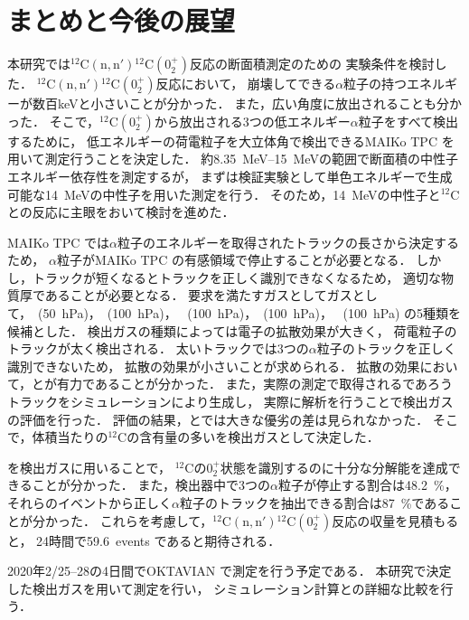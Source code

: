 \documentclass[../master]{subfiles}
\begin{document}
\chapter{まとめと今後の展望}
本研究では${}^{12}\mathrm{C}(\mathrm{n}, \mathrm{n}'){}^{12}\mathrm{C} (0_2^+)$反応の断面積測定のための
実験条件を検討した．
${}^{12}\mathrm{C}(\mathrm{n}, \mathrm{n}'){}^{12}\mathrm{C} (0_2^+)$反応において，
崩壊してできる$\alpha$粒子の持つエネルギーが数百\si{\kilo\electronvolt}と小さいことが分かった．
また，広い角度に放出されることも分かった．
そこで，${}^{12}\mathrm{C} (0_2^+)$から放出される3つの低エネルギー$\alpha$粒子をすべて検出するために，
低エネルギーの荷電粒子を大立体角で検出できるMAIKo TPC を用いて測定行うことを決定した．
約\SIrange{8.35}{15}{\mega\electronvolt}の範囲で断面積の中性子エネルギー依存性を測定するが，
まずは検証実験として単色エネルギーで生成可能な\SI{14}{\mega\electronvolt}の中性子を用いた測定を行う．
そのため，\SI{14}{\mega\electronvolt}の中性子と${}^{12}\mathrm{C}$との反応に主眼をおいて検討を進めた．

MAIKo TPC では$\alpha$粒子のエネルギーを取得されたトラックの長さから決定するため，
$\alpha$粒子がMAIKo TPC の有感領域で停止することが必要となる．
しかし，トラックが短くなるとトラックを正しく識別できなくなるため，
適切な物質厚であることが必要となる．
要求を満たすガスとしてガスとして，\Methane~(\SI{50}{\hecto\pascal})，\MethaneHydro~(\SI{100}{\hecto\pascal})，
\MethaneHerium~(\SI{100}{\hecto\pascal})，\isoButaneHydro~(\SI{100}{\hecto\pascal})，
\isoButaneHerium~(\SI{100}{\hecto\pascal}) の5種類を候補とした．
検出ガスの種類によっては電子の拡散効果が大きく，
荷電粒子のトラックが太く検出される．
太いトラックでは3つの$\alpha$粒子のトラックを正しく識別できないため，
拡散の効果が小さいことが求められる．
拡散の効果において，\MethaneHydro と\isoButaneHydro が有力であることが分かった．
また，実際の測定で取得されるであろうトラックをシミュレーションにより生成し，
実際に解析を行うことで検出ガスの評価を行った．
評価の結果，\MethaneHydro と\isoButaneHydro では大きな優劣の差は見られなかった．
そこで，体積当たりの${}^{12}\mathrm{C}$の含有量の多い\isoButaneHydro を検出ガスとして決定した．

\isoButaneHydro を検出ガスに用いることで，
${}^{12}\mathrm{C}$の$0_2^+$状態を識別するのに十分な分解能を達成できることが分かった．
また，検出器中で3つの$\alpha$粒子が停止する割合は\SI{48.2}{\percent}，
それらのイベントから正しく$\alpha$粒子のトラックを抽出できる割合は\SI{87}{\percent}であることが分かった．
これらを考慮して，${}^{12}\mathrm{C}(\mathrm{n}, \mathrm{n}'){}^{12}\mathrm{C} (0_2^+)$反応の収量を見積もると，
24時間で59.6~events であると期待される．

2020年2/25--28の4日間でOKTAVIAN で測定を行う予定である．
本研究で決定した検出ガスを用いて測定を行い，
シミュレーション計算との詳細な比較を行う．
\end{document}
